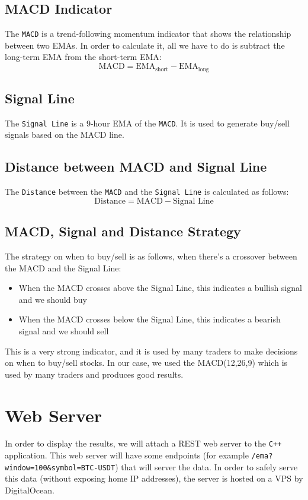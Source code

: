 \documentclass{article}
\begin{document}
\subsection{MACD Indicator}
The \texttt{MACD} is a trend-following momentum indicator that shows the relationship between two EMAs.
In order to calculate it, all we have to do is subtract the long-term EMA from the short-term EMA:
\begin{equation*}
\text{MACD} = \text{EMA}_{\text{short}} - \text{EMA}_{\text{long}}
\end{equation*}

\subsection{Signal Line}
The \texttt{Signal Line} is a 9-hour EMA of the \texttt{MACD}. It is used to generate buy/sell signals based on the MACD line.

\subsection{Distance between MACD and Signal Line}
The \texttt{Distance} between the \texttt{MACD} and the \texttt{Signal Line} is calculated as follows:
\begin{equation*}
\text{Distance} = \text{MACD} - \text{Signal Line}
\end{equation*}

\subsection{MACD, Signal and Distance Strategy}
The strategy on when to buy/sell is as follows, when there's a crossover between the MACD and the Signal Line:
\begin{itemize}
    \item When the MACD crosses above the Signal Line, this indicates a bullish signal and we should buy
    \item When the MACD crosses below the Signal Line, this indicates a bearish signal and we should sell
\end{itemize}

This is a very strong indicator, and it is used by many traders to make decisions on when to buy/sell stocks.
In our case, we used the MACD(12,26,9) which is used by many traders and produces good results.

\section{Web Server}
In order to display the results, we will attach a REST web server to the \texttt{C++} application.
This web server will have some endpoints (for example \texttt{/ema?window=100\&symbol=BTC-USDT})
that will server the data. In order to safely serve this data (without exposing home IP addresses),
the server is hosted on a VPS by DigitalOcean.
\end{document}
